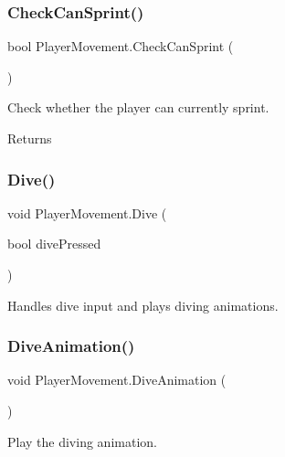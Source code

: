\subsubsection{\texorpdfstring{Check\+Can\+Sprint()}{CheckCanSprint()}}
{\footnotesize\ttfamily bool Player\+Movement.\+Check\+Can\+Sprint (\begin{DoxyParamCaption}{ }\end{DoxyParamCaption})}



Check whether the player can currently sprint. 

\begin{DoxyReturn}{Returns}

\end{DoxyReturn}
\mbox{\label{class_player_movement_a17f581958c3a8d8bf6f230117ce79a4e}} 
\subsubsection{\texorpdfstring{Dive()}{Dive()}}
{\footnotesize\ttfamily void Player\+Movement.\+Dive (\begin{DoxyParamCaption}\item[{bool}]{dive\+Pressed }\end{DoxyParamCaption})}



Handles dive input and plays diving animations. 

\mbox{\label{class_player_movement_a7e49eea241ab7a3b11125c33aae4b12d}} 
\subsubsection{\texorpdfstring{Dive\+Animation()}{DiveAnimation()}}
{\footnotesize\ttfamily void Player\+Movement.\+Dive\+Animation (\begin{DoxyParamCaption}{ }\end{DoxyParamCaption})\hspace{0.3cm}{\ttfamily [private]}}



Play the diving animation. 

